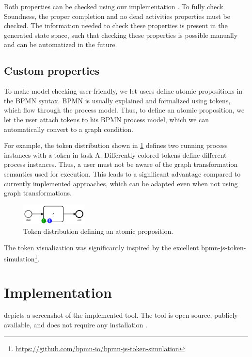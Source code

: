 \documentclass[adraft, copyright, creativecommons]{eptcs} %
\begin{document}
Both properties can be checked using our implementation \cite{timkrauterArtifactsTERMGRAPH2022}.
To fully check Soundness, the proper completion and no dead activities properties must be checked.
The information needed to check these properties is present in the generated state space, such that checking these properties is possible manually and can be automatized in the future.
\subsection{Custom properties}

To make model checking user-friendly, we let users define atomic propositions in the BPMN syntax.
BPMN is usually explained and formalized using tokens, which flow through the process model.
Thus, to define an atomic proposition, we let the user attach tokens to his BPMN process model, which we can automatically convert to a graph condition.

For example, the token distribution shown in \cref{fig:atomicProposition} defines two running process instances with a token in task A.
Differently colored tokens define different process instances.
Thus, a user must not be aware of the graph transformation semantics used for execution.
This leads to a significant advantage compared to currently implemented approaches, which can be adapted even when not using graph transformations.

\begin{figure}[h]
    \centering
    \includegraphics[width=0.3\textwidth]{images/bpmn_semantics-atomicProp.pdf}
    \caption{Token distribution defining an atomic proposition.}
    \label{fig:atomicProposition}
\end{figure}

The token visualization was significantly inspired by the excellent bpmn-js-token-simulation\footnote{\url{https://github.com/bpmn-io/bpmn-js-token-simulation}}.
\section{Implementation} \label{sec:impl}
 depicts a screenshot of the implemented tool.
The tool is open-source, publicly available, and does not require any installation \cite{timkrauterArtifactsTERMGRAPH2022}.
\end{document}
